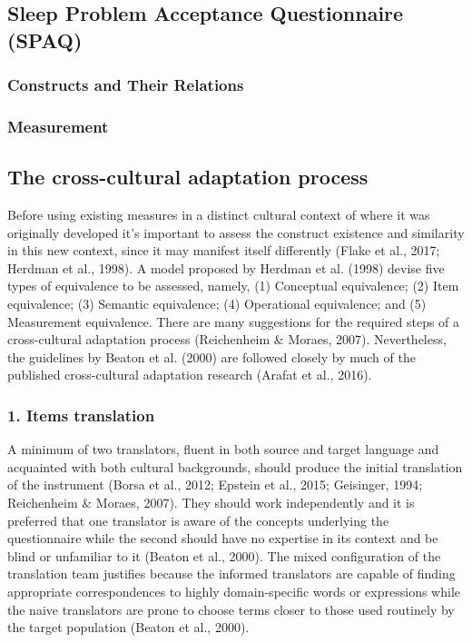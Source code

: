\documentclass[
  ,doc,11pt, twoside,floatsintext]{apa6}
\begin{document}
\hypertarget{sleep-problem-acceptance-questionnaire-spaq}{%
\subsection{Sleep Problem Acceptance Questionnaire (SPAQ)}\label{sleep-problem-acceptance-questionnaire-spaq}}

\hypertarget{constructs-and-their-relations-1}{%
\subsubsection{Constructs and Their Relations}\label{constructs-and-their-relations-1}}

\hypertarget{measurement-1}{%
\subsubsection{Measurement}\label{measurement-1}}

\hypertarget{the-cross-cultural-adaptation-process}{%
\subsection{The cross-cultural adaptation process}\label{the-cross-cultural-adaptation-process}}

Before using existing measures in a distinct cultural context of where it was originally developed it's important to assess the construct existence and similarity in this new context, since it may manifest itself differently (Flake et al., 2017; Herdman et al., 1998). A model proposed by Herdman et al. (1998) devise five types of equivalence to be assessed, namely, (1) Conceptual equivalence; (2) Item equivalence; (3) Semantic equivalence; (4) Operational equivalence; and (5) Measurement equivalence. There are many suggestions for the required steps of a cross-cultural adaptation process (Reichenheim \& Moraes, 2007). Nevertheless, the guidelines by Beaton et al. (2000) are followed closely by much of the published cross-cultural adaptation research (Arafat et al., 2016).

\hypertarget{items-translation}{%
\subsubsection{1. Items translation}\label{items-translation}}

A minimum of two translators, fluent in both source and target language and acquainted with both cultural backgrounds, should produce the initial translation of the instrument (Borsa et al., 2012; Epstein et al., 2015; Geisinger, 1994; Reichenheim \& Moraes, 2007). They should work independently and it is preferred that one translator is aware of the concepts underlying the questionnaire while the second should have no expertise in its context and be blind or unfamiliar to it (Beaton et al., 2000). The mixed configuration of the translation team justifies because the informed translators are capable of finding appropriate correspondences to highly domain-specific words or expressions while the naive translators are prone to choose terms closer to those used routinely by the target population (Beaton et al., 2000).
\end{document}
